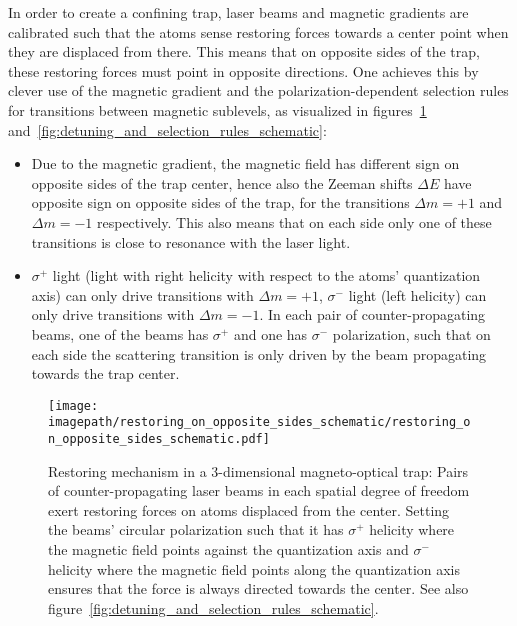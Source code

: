 In order to create a confining trap, laser beams and magnetic gradients are calibrated such that the atoms sense restoring forces towards a center point when they are displaced from there. This means that on opposite sides of the trap, these restoring forces must point in opposite directions. One achieves this by clever use of the magnetic gradient and the polarization-dependent selection rules for transitions between magnetic sublevels, as visualized in figures~\ref{fig:restoring_on_opposite_sides_schematic} and~\ref{fig:detuning_and_selection_rules_schematic}:
\begin{itemize}
    \item Due to the magnetic gradient, the magnetic field has different sign on opposite sides of the trap center, hence also the Zeeman shifts $\Delta E$ have opposite sign on opposite sides of the trap, for the transitions $\Delta m = +1$ and $\Delta m = -1$ respectively. This also means that on each side only one of these transitions is close to resonance with the laser light.
    \item $\sigma^+$ light (light with right helicity with respect to the atoms' quantization axis) can only drive transitions with $\Delta m = +1$, $\sigma^-$ light (left helicity) can only drive transitions with $\Delta m = -1$. In each pair of counter-propagating beams, one of the beams has $\sigma^+$ and one has $\sigma^-$ polarization, such that on each side the scattering transition is only driven by the beam propagating towards the trap center.
\end{itemize}

\begin{figure}
    \centering
    \texttt{[image: \\imagepath/restoring\_on\_opposite\_sides\_schematic/restoring\_on\_opposite\_sides\_schematic.pdf]}
    \caption{Restoring mechanism in a 3-dimensional magneto-optical trap: Pairs of counter-propagating laser beams in each spatial degree of freedom exert restoring forces on atoms displaced from the center. Setting the beams' circular polarization such that it has $\sigma^+$ helicity where the magnetic field points against the quantization axis and $\sigma^-$ helicity where the magnetic field points along the quantization axis ensures that the force is always directed towards the center. See also figure~\ref{fig:detuning_and_selection_rules_schematic}.}
    \label{fig:restoring_on_opposite_sides_schematic}
\end{figure} 

